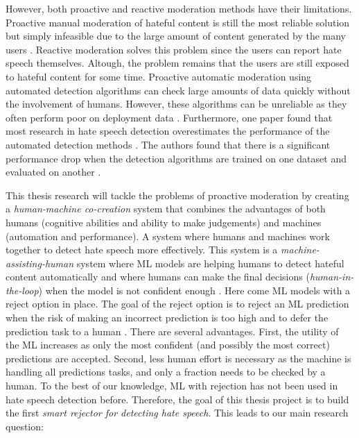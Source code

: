 However, both proactive and reactive moderation methods have their limitations. Proactive manual moderation of hateful content is still the most reliable solution but simply infeasible due to the large amount of content generated by the many users \cite{balayn2021automatic}. Reactive moderation solves this problem since the users can report hate speech themselves. Altough, the problem remains that the users are still exposed to hateful content for some time. Proactive automatic moderation using automated detection algorithms can check large amounts of data quickly without the involvement of humans. However, these algorithms can be unreliable as they often perform poor on deployment data \cite{balayn2021automatic}. Furthermore, one paper found that most research in hate speech detection overestimates the performance of the automated detection methods \cite{arango2019hate}. The authors found that there is a significant performance drop when the detection algorithms are trained on one dataset and evaluated on another \cite{arango2019hate}.

This thesis research will tackle the problems of proactive moderation by creating a \textit{human-machine co-creation} \cite{woo2020future} system that combines the advantages of both humans (cognitive abilities and ability to make judgements) and machines (automation and performance). A system where humans and machines work together to detect hate speech more effectively. This system is a \textit{machine-assisting-human} system where ML models are helping humans to detect hateful content automatically and where humans can make the final decisions (\textit{human-in-the-loop}) when the model is not confident enough \cite{woo2020future}. Here come ML models with a reject option in place. The goal of the reject option is to reject an ML prediction when the risk of making an incorrect prediction is too high and to defer the prediction task to a human \cite{hendrickx2021machine}. There are several advantages. First, the utility of the ML increases as only the most confident (and possibly the most correct) predictions are accepted. Second, less human effort is necessary as the machine is handling all predictions tasks, and only a fraction needs to be checked by a human. To the best of our knowledge, ML with rejection has not been used in hate speech detection before. Therefore, the goal of this thesis project is to build the first \textit{smart rejector for detecting hate speech}. This leads to our main research question:


